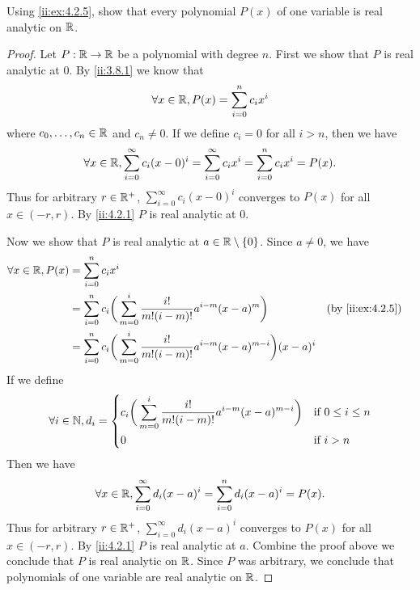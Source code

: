 \begin{ex}\label{ii:ex:4.2.6}
  Using \cref{ii:ex:4.2.5}, show that every polynomial \(P(x)\) of one variable is real analytic on \(\mathbb{R}\).
\end{ex}

\begin{proof}
  Let \(P : \mathbb{R} \to \mathbb{R}\) be a polynomial with degree \(n\).
  First we show that \(P\) is real analytic at \(0\).
  By \cref{ii:3.8.1} we know that
  \[
    \forall x \in \mathbb{R}, P(x) = \sum_{i = 0}^n c_i x^i
  \]
  where \(c_0, \dots, c_n \in \mathbb{R}\) and \(c_n \neq 0\).
  If we define \(c_i = 0\) for all \(i > n\), then we have
  \[
    \forall x \in \mathbb{R}, \sum_{i = 0}^\infty c_i (x - 0)^i = \sum_{i = 0}^\infty c_i x^i = \sum_{i = 0}^n c_i x^i = P(x).
  \]
  Thus for arbitrary \(r \in \mathbb{R}^+\), \(\sum_{i = 0}^\infty c_i (x - 0)^i\) converges to \(P(x)\) for all \(x \in (-r, r)\).
  By \cref{ii:4.2.1} \(P\) is real analytic at \(0\).

  Now we show that \(P\) is real analytic at \(a \in \mathbb{R} \setminus \left\lbrace0\right\rbrace\).
  Since \(a \neq 0\), we have
  \begin{align*}
    \forall x \in \R, P(x) & = \sum_{i = 0}^n c_i x^i                                                                                                          \\
                           & = \sum_{i = 0}^n c_i \bigg(\sum_{m = 0}^i \dfrac{i!}{m! (i - m)!} a^{i - m} (x - a)^m\bigg)                 &  & \by{ii:ex:4.2.5} \\
                           & = \sum_{i = 0}^n c_i \bigg(\sum_{m = 0}^i \dfrac{i!}{m! (i - m)!} a^{i - m} (x - a)^{m - i}\bigg) (x - a)^i
  \end{align*}
  If we define
  \[
    \forall i \in \mathbb{N}, d_i = \begin{dcases}
      c_i \bigg(\sum_{m = 0}^i \dfrac{i!}{m! (i - m)!} a^{i - m} (x - a)^{m - i}\bigg) & \text{if } 0 \leq i \leq n \\
      0                                                                                & \text{if } i > n
    \end{dcases}
  \]
  Then we have
  \[
    \forall x \in \mathbb{R}, \sum_{i = 0}^\infty d_i (x - a)^i = \sum_{i = 0}^n d_i (x - a)^i = P(x).
  \]
  Thus for arbitrary \(r \in \mathbb{R}^+\), \(\sum_{i = 0}^\infty d_i (x - a)^i\) converges to \(P(x)\) for all \(x \in (-r, r)\).
  By \cref{ii:4.2.1} \(P\) is real analytic at \(a\).
  Combine the proof above we conclude that \(P\) is real analytic on \(\mathbb{R}\).
  Since \(P\) was arbitrary, we conclude that polynomials of one variable are real analytic on \(\mathbb{R}\).
\end{proof}

